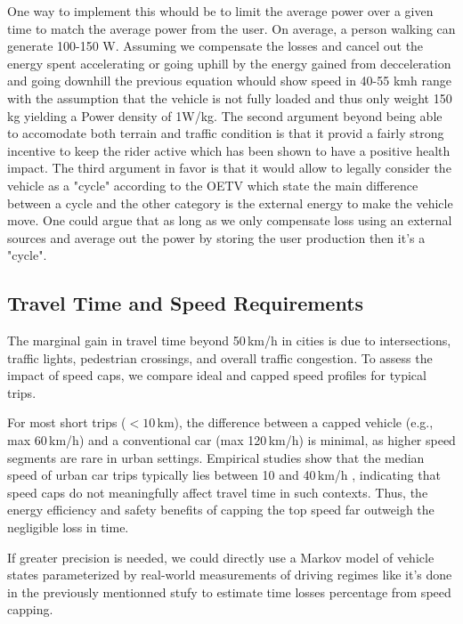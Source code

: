 One way to implement this whould be to limit the average power over a given time to match the average power from the user. On average, a person walking can generate 100-150 W. Assuming we compensate the losses and cancel out the energy spent accelerating or going uphill by the energy gained from decceleration and going downhill the previous equation whould show speed in 40-55 kmh range with the assumption that the vehicle is not fully loaded and thus only weight 150 kg yielding a Power density of 1W/kg. The second argument beyond being able to accomodate both terrain and traffic condition is that it provid a fairly strong incentive to keep the rider active which has been shown to have a positive health impact. The third argument in favor is that it would allow to legally consider the vehicle as a "cycle" according to the OETV\cite{noauthor_rs_nodate} which state the main difference between a cycle and the other category is the external energy to make the vehicle move. One could argue that as long as we only compensate loss using an external sources and average out the power by storing the user production then it's a "cycle".

\newpage

\subsection{Travel Time and Speed Requirements}

The marginal gain in travel time beyond 50\,km/h in cities is due to intersections, traffic lights, pedestrian crossings, and overall traffic congestion. To assess the impact of speed caps, we compare ideal and capped speed profiles for typical trips.

For most short trips ($<10$\,km), the difference between a capped vehicle (e.g., max 60\,km/h) and a conventional car (max 120\,km/h) is minimal, as higher speed segments are rare in urban settings. Empirical studies show that the median speed of urban car trips typically lies between 10 and 40\,km/h \cite{ma_real-world_2019}, indicating that speed caps do not meaningfully affect travel time in such contexts. Thus, the energy efficiency and safety benefits of capping the top speed far outweigh the negligible loss in time.

If greater precision is needed, we could directly use a Markov model of vehicle states parameterized by real-world measurements of driving regimes like it's done in the previously mentionned stufy to estimate time losses percentage from speed capping.
